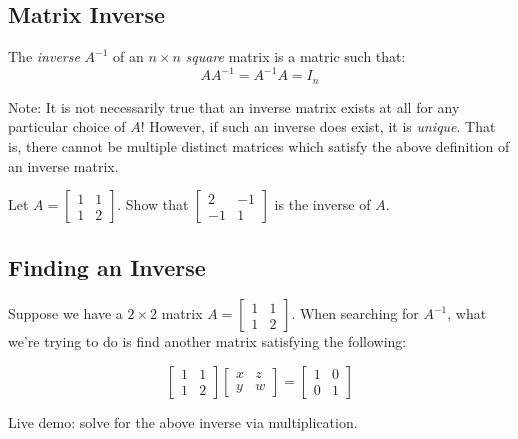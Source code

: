 \documentclass[11pt]{exam}
\begin{document}
    \pagebreak
    \subsection{Matrix Inverse}

    The \textit{inverse} $A^{-1}$ of an $n \times n$ \textit{square} matrix is a matric such that:
    $$AA^{-1} = A^{-1}A = I_n$$

    Note: It is not necessarily true that an inverse matrix exists at all for any particular choice of $A$! However, if such an inverse does
    exist, it is \textit{unique}. That is, there cannot be multiple distinct matrices which satisfy the above definition of an inverse matrix.

    \vspace{10px}
    \begin{questions}
        \item Let $A = \begin{bmatrix} 1 & 1 \\ 1 & 2 \end{bmatrix}$. Show that $\begin{bmatrix} 2 & -1 \\ -1 & 1 \end{bmatrix}$ is the inverse of $A$.
    \end{questions}

    \vspace{20px}
    \subsection{Finding an Inverse}
    Suppose we have a $2 \times 2$ matrix $A = \begin{bmatrix} 1 & 1 \\ 1 & 2 \end{bmatrix}$. When searching for $A^{-1}$, what we're
    trying to do is find another matrix satisfying the following:

    $$\begin{bmatrix} 1 & 1 \\ 1 & 2 \end{bmatrix}\begin{bmatrix} x & z \\ y & w \end{bmatrix} = \begin{bmatrix} 1 & 0 \\ 0 & 1 \end{bmatrix}$$

    Live demo: solve for the above inverse via multiplication.
\end{document}
